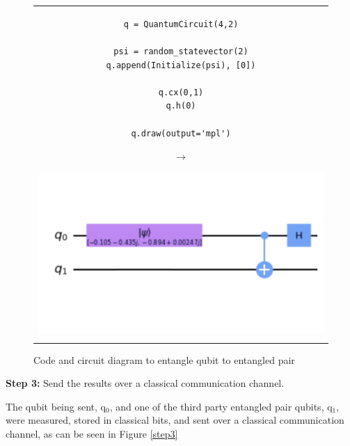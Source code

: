 \begin{figure}[H]
\centering
\begin{tabular}{c}
\begin{minipage}[c]{.45\linewidth}
\begin{verbatim}
q = QuantumCircuit(4,2)

psi = random_statevector(2)
q.append(Initialize(psi), [0])

q.cx(0,1)
q.h(0)

q.draw(output='mpl')
\end{verbatim}
\end{minipage}
\begin{minipage}[c]{.1\linewidth}
\centering
$\rightarrow$
\end{minipage}
\begin{minipage}[c]{.4\linewidth}
\centering
\includegraphics[width=\textwidth]{lab3/images/Step2.png}
\end{minipage}\\
\\ 
\end{tabular}
\caption{Code and circuit diagram to entangle qubit to entangled pair}
\label{step2}
\end{figure}


\textbf{Step 3:} Send the results over a classical communication channel.

The qubit being sent, q$_0$, and one of the third party entangled pair qubits, q$_1$, were measured, stored in classical bits, and sent over a classical communication channel, as can be seen in Figure \ref{step3}

